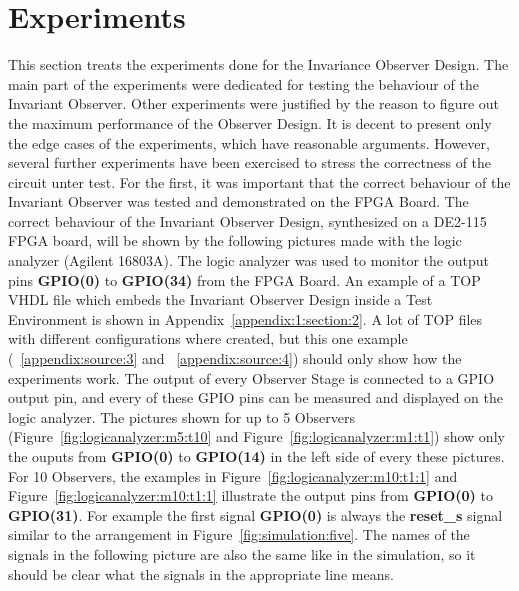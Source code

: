 \section{Experiments}
\label{chapter:4:section:3}
This section treats the experiments done for the Invariance Observer Design. 
The main part of the experiments were dedicated for testing the behaviour of the Invariant Observer. 
Other experiments were justified by the reason to figure out the maximum performance of the Observer Design. 
It is decent to present only the edge cases of the experiments, which have reasonable arguments.
However, several further experiments have been exercised to stress the correctness of the circuit unter test. 
For the first, it was important that the correct behaviour of the Invariant Observer was tested and demonstrated on the FPGA Board. 
The correct behaviour of the Invariant Observer Design, synthesized on a DE2-115 FPGA board, will be shown by the following pictures made with the logic analyzer (Agilent 16803A). 
The logic analyzer was used to monitor the output pins \textbf{GPIO(0)} to \textbf{GPIO(34)} from the FPGA Board. 
An example of a TOP VHDL file which embeds the Invariant Observer Design inside a Test Environment is shown in Appendix~\ref{appendix:1:section:2}. 
A lot of TOP files with different configurations where created, but this one example (~\ref{appendix:source:3} and ~\ref{appendix:source:4}) should only show how the experiments work. 
The output of every Observer Stage is connected to a GPIO output pin, and every of these GPIO pins can be measured and displayed on the logic analyzer. 
The pictures shown for up to 5 Observers (Figure~\ref{fig:logicanalyzer:m5:t10} and Figure~\ref{fig:logicanalyzer:m1:t1}) show only the ouputs from \textbf{GPIO(0)} to \textbf{GPIO(14)} in the left side of every these pictures. 
For 10 Observers, the examples in Figure~\ref{fig:logicanalyzer:m10:t1:1} and Figure~\ref{fig:logicanalyzer:m10:t1:1} illustrate the output pins from \textbf{GPIO(0)} to \textbf{GPIO(31)}. 
For example the first signal \textbf{GPIO(0)} is always the \textbf{reset\_s} signal similar to the arrangement in Figure~\ref{fig:simulation:five}. 
The names of the signals in the following picture are also the same like in the simulation, so it should be clear what the signals in the appropriate line means. 

